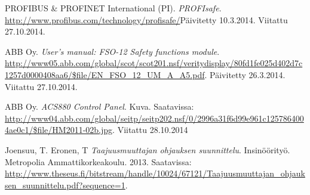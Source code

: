 \documentclass[finnish,12pt,a4paper,pdftex,elec,utf8]{aaltothesis}
\begin{document}
\begin{thebibliography}{99}
 PROFIBUS \& PROFINET International (PI). \textit{PROFIsafe}. \url{http://www.profibus.com/technology/profisafe/}Päivitetty 10.3.2014. Viitattu 27.10.2014.

 ABB Oy. \textit{User's manual: FSO-12 Safety functions module}. \url{http://www05.abb.com/global/scot/scot201.nsf/veritydisplay/80fd1fe025d402d7c1257d0000408aa6/$file/EN_FSO_12_UM_A_A5.pdf}. Päivitetty 26.3.2014. Viitattu 27.10.2014.

ABB Oy. \textit{ACS880 Control Panel}. Kuva. Saatavissa: \url{http://www04.abb.com/global/seitp/seitp202.nsf/0/2996a31f6d99e961c1257864004ae0c1/$file/HM2011-02b.jpg}. Viitattu 28.10.2014

Joensuu, T. Eronen, T \textit{Taajuusmuuttajan ohjauksen suunnittelu}. Insinöörityö. Metropolia Ammattikorkeakoulu. 2013. Saatavissa: \url{http://www.theseus.fi/bitstream/handle/10024/67121/Taajuusmuuttajan_ohjauksen_suunnittelu.pdf?sequence=1}. 

\end{thebibliography}



\clearpage

\thesisappendix
\end{document}
